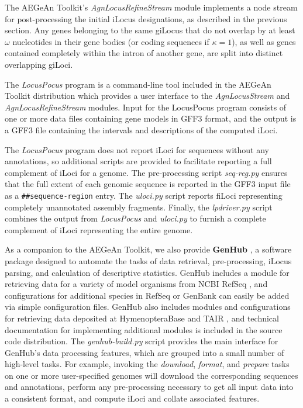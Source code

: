The AEGeAn Toolkit's \textit{AgnLocusRefineStream} module implements a node stream for post-processing the initial iLocus designations, as described in the previous section.
Any genes belonging to the same giLocus that do not overlap by at least $\omega$ nucleotides in their gene bodies (or coding sequences if $\kappa = 1$), as well as genes contained completely within the intron of another gene, are split into distinct overlapping giLoci.

The \textit{LocusPocus} program is a command-line tool included in the AEGeAn Toolkit distribution which provides a user interface to the \textit{AgnLocusStream} and \textit{AgnLocusRefineStream} modules.
Input for the LocusPocus program consists of one or more data files containing gene models in GFF3 format, and the output is a GFF3 file containing the intervals and descriptions of the computed iLoci.

The \textit{LocusPocus} program does not report iLoci for sequences without any annotations, so additional scripts are provided to facilitate reporting a full complement of iLoci for a genome.
The pre-processing script \textit{seq-reg.py} ensures that the full extent of each genomic sequence is reported in the GFF3 input file as a \texttt{\#\#sequence-region} entry.
The \textit{uloci.py} script reports fiLoci representing completely unannotated assembly fragments.
Finally, the \textit{lpdriver.py} script combines the output from \textit{LocusPocus} and \textit{uloci.py} to furnish a complete complement of iLoci representing the entire genome.

As a companion to the AEGeAn Toolkit, we also provide \textbf{GenHub} \cite{GenHub}, a software package designed to automate the tasks of data retrieval, pre-processing, iLocus parsing, and calculation of descriptive statistics.
GenHub includes a module for retrieving data for a variety of model organisms from NCBI RefSeq \cite{RefSeq}, and configurations for additional species in RefSeq or GenBank can easily be added via simple configuration files.
GenHub also includes modules and configurations for retrieving data deposited at HymenopteraBase \cite{HymBase} and TAIR \cite{TAIR}, and technical documentation for implementing additional modules is included in the source code distribution.
The \textit{genhub-build.py} script provides the main interface for GenHub's data processing features, which are grouped into a small number of high-level tasks.
For example, invoking the \textit{download}, \textit{format}, and \textit{prepare} tasks on one or more user-specified genomes will download the corresponding sequences and annotations, perform any pre-processing necessary to get all input data into a consistent format, and compute iLoci and collate associated features.


